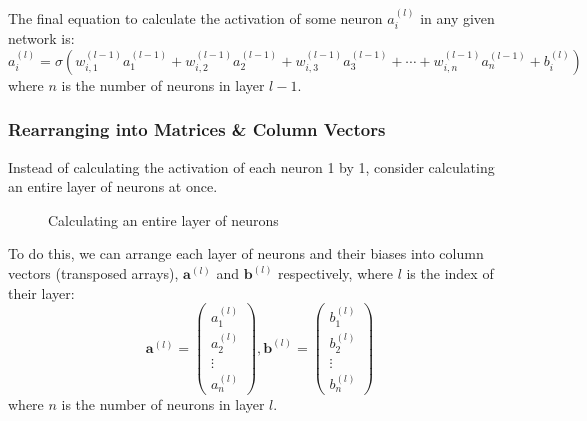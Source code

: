 \documentclass[12pt]{report}
\newcommand{\nodetext}[2]{$a^{\left(#1\right)}_#2$}
\begin{document}
The final equation to calculate the activation of some neuron $a^{\left(l\right)}_i$ in any given network is:
\begin{equation}\label{eq:activationofaneuron}
    a^{\left(l\right)}_i=\sigma \left(w^{\left(l-1\right)}_{i,1}a^{\left(l-1\right)}_1+w^{\left(l-1\right)}_{i,2}a^{\left(l-1\right)}_2+w^{\left(l-1\right)}_{i,3}a^{\left(l-1\right)}_3+\cdots +w^{\left(l-1\right)}_{i,n}a^{\left(l-1\right)}_n+b^{\left(l\right)}_i\right)
\end{equation}
where $n$ is the number of neurons in layer $l-1$.

\subsubsection{Rearranging into Matrices \& Column Vectors}
Instead of calculating the activation of each neuron 1 by 1, consider calculating an entire layer of neurons at once. 
\begin{figure}[H]
\centering
\begin{neuralnetwork}[nodespacing=15mm,layerspacing=30mm]
\inputlayer[count=5, title=Input Layer, text=\nodetext, bias=false]
\hiddenlayer[count=4, title=Hidden Layer 1, text=\nodetext, bias=false] \linklayers[style={black}]
\hiddenlayer[count=4, title=Hidden Layer 2, text=\nodetext, bias=false] \linklayers
\outputlayer[count=1, title=Output Layer, text=\nodetext, bias=false] \linklayers
\end{neuralnetwork}
\caption{Calculating an entire layer of neurons}
\end{figure}

To do this, we can arrange each layer of neurons and their biases into column vectors (transposed arrays), $\mathbf{a}^{\left(l\right)}$ and $\mathbf{b}^{\left(l\right)}$ respectively, where $l$ is the index of their layer:
\begin{equation}
    \mathbf{a}^{\left(l\right)}=\begin{pmatrix}a^{\left(l\right)}_1\\[0.3em]a^{\left(l\right)}_2\\\vdots \\a^{\left(l\right)}_n\end{pmatrix},\mathbf{b}^{\left(l\right)}=\begin{pmatrix}b^{\left(l\right)}_1\\[0.3em]b^{\left(l\right)}_2\\\vdots \\b^{\left(l\right)}_n\end{pmatrix}
\end{equation}
where $n$ is the number of neurons in layer $l$.
\end{document}
